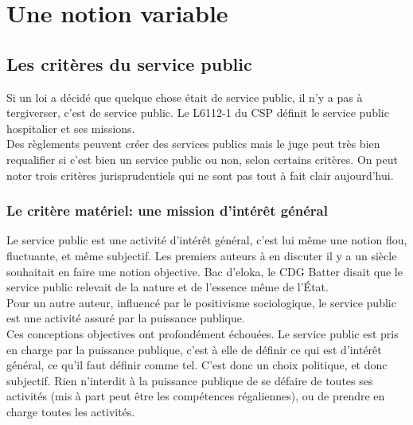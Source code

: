 \documentclass[10pt, a4paper, openany]{book}
\begin{document}
\section{Une notion variable}

\subsection{Les critères du service public}

Si un loi a décidé que quelque chose était de service public, il n'y a pas à tergiverser, c'est de service public. Le L6112-1 du CSP définit le service public hospitalier et ses missions. \\
Des règlements peuvent créer des services publics mais le juge peut très bien requalifier si c'est bien un service public ou non, selon certains critères. On peut noter trois critères jurisprudentiels qui ne sont pas tout à fait clair aujourd'hui. 

\subsubsection{Le critère matériel: une mission d'intérêt général}

Le service public est une activité d'intérêt général, c'est lui même une notion flou, fluctuante, et même subjectif. Les premiers auteurs à en discuter il y a un siècle souhaitait en faire une notion objective. Bac d'eloka, le CDG Batter disait que le service public relevait de la nature et de l'essence même de l'État. \\
Pour un autre auteur, influencé par le positivisme sociologique, le service public est une activité assuré par la puissance publique. \\
Ces conceptions objectives ont profondément échouées. Le service public est pris en charge par la puissance publique, c'est à elle de définir ce qui est d'intérêt général, ce qu'il faut définir comme tel. C'est donc un choix politique, et donc subjectif. Rien n'interdit à la puissance publique de se défaire de toutes ses activités (mis à part peut être les compétences régaliennes), ou de prendre en charge toutes les activités.
\end{document}
